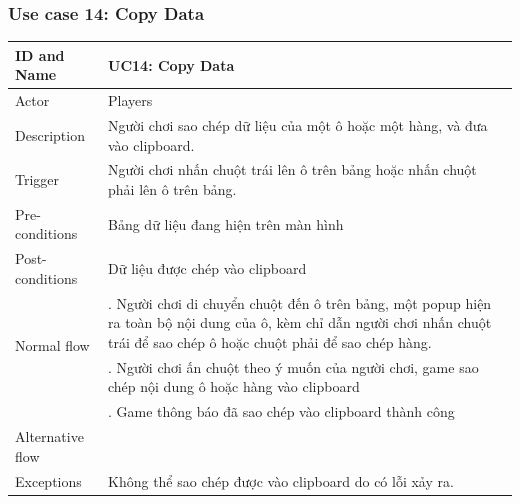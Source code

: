 \subsubsection{Use case 14: Copy Data}
\begin{center}
	\begin{tabular}{|l|p{12cm}|}
		\hline
		ID and Name & UC14: Copy Data \\
		\hline
		Actor  & Players \\
		\hline
		Description  & Người chơi sao chép dữ liệu của một ô hoặc một hàng, và đưa vào clipboard.\\
		\hline
		Trigger  & Người chơi nhấn chuột trái lên ô trên bảng hoặc nhấn chuột phải lên ô trên bảng.\\
		\hline
		Pre-conditions & Bảng dữ liệu đang hiện trên màn hình\\
		\hline
		Post-conditions & Dữ liệu được chép vào clipboard\\
		\hline
		\multirow{2}{*}{Normal flow}      &\qquad 1. Người chơi di chuyển chuột đến ô trên bảng, một popup hiện ra toàn bộ nội dung của ô, kèm chỉ dẫn người chơi nhấn chuột trái để sao chép ô hoặc chuột phải để sao chép hàng.\\
		&\qquad 2. Người chơi ấn chuột theo ý muốn của người chơi, game sao chép nội dung ô hoặc hàng vào clipboard\\
		&\qquad 3. Game thông báo đã sao chép vào clipboard thành công\\
		\hline
		Alternative flow  & \\
		\hline
		Exceptions  & Không thể sao chép được vào clipboard do có lỗi xảy ra.\\
		\hline
	\end{tabular}
\end{center}